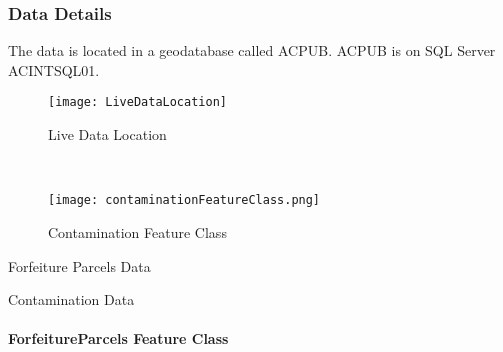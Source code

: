 \documentclass[class=book , crop=false, titlepage, twoside, multi={itemize, figure, verbatim}, float=false]{standalone}
\begin{document}
\subsubsection[Data Details]{Data Details\texorpdfstring{\\}{}}
%
\noindent The data is located in a geodatabase called ACPUB.  ACPUB is on SQL Server ACINTSQL01.
%
\begin{wrapfigure}{r}{0.6\textwidth}
\centering
\texttt{[image: LiveDataLocation]}
\caption{Live Data Location}
\vspace{.25in}

\HRule \\[.4cm] %
\vspace{.25in}

\texttt{[image: contaminationFeatureClass.png]}
\caption{Contamination Feature Class}
\end{wrapfigure}
%
\vspace{1in}

Forfeiture Parcels Data
\vspace{3in}

Contamination Data
\clearpage
%
%
%
\paragraph{ForfeitureParcels Feature Class}
\vspace{.5in}
\end{document}
